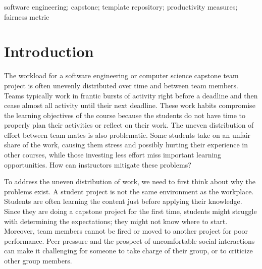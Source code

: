 \documentclass[10pt, conference]{IEEEtran}
\begin{document}
\begin{IEEEkeywords}
software engineering; capstone; template repository; productivity measures;
fairness metric
\end{IEEEkeywords}

\section{Introduction} \label{SecIntro}

The workload for a software engineering or computer science capstone team
project is often unevenly distributed over time and between team members.  Teams
typically work in frantic bursts of activity right before a deadline and then
cease almost all activity until their next deadline.  These work habits
compromise the learning objectives of the course because the students do not
have time to properly plan their activities or reflect on their work.  The
uneven distribution of effort between team mates is also problematic.  Some
students take on an unfair share of the work, causing them stress and possibly
hurting their experience in other courses, while those investing less effort
miss important learning opportunities.  How can instructors mitigate these
problems?

To address the uneven distribution of work, we need to first think about why the
problems exist.  A student project is not the same environment as the workplace.
Students are often learning the content just before applying their knowledge.
Since they are doing a capstone project for the first time, students might
struggle with determining the expectations; they might not know where to start.
Moreover, team members cannot be fired or moved to another project for poor
performance.  Peer pressure and the prospect of uncomfortable social
interactions can make it challenging for someone to take charge of their group,
or to criticize other group members. %

\end{document}
